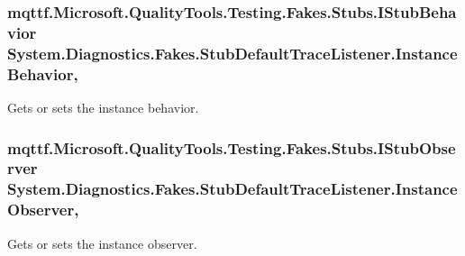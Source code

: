 \hypertarget{class_system_1_1_diagnostics_1_1_fakes_1_1_stub_default_trace_listener_ae485fa4b34ce449699b4502839963977}{
\subsubsection[{Instance\-Behavior}]{\setlength{\rightskip}{0pt plus 5cm}mqttf.\-Microsoft.\-Quality\-Tools.\-Testing.\-Fakes.\-Stubs.\-I\-Stub\-Behavior System.\-Diagnostics.\-Fakes.\-Stub\-Default\-Trace\-Listener.\-Instance\-Behavior\hspace{0.3cm}{\ttfamily [get]}, {\ttfamily [set]}}}\label{class_system_1_1_diagnostics_1_1_fakes_1_1_stub_default_trace_listener_ae485fa4b34ce449699b4502839963977}


Gets or sets the instance behavior.

\hypertarget{class_system_1_1_diagnostics_1_1_fakes_1_1_stub_default_trace_listener_a4d3e809aed363f2afbf062638d3773e4}{
\subsubsection[{Instance\-Observer}]{\setlength{\rightskip}{0pt plus 5cm}mqttf.\-Microsoft.\-Quality\-Tools.\-Testing.\-Fakes.\-Stubs.\-I\-Stub\-Observer System.\-Diagnostics.\-Fakes.\-Stub\-Default\-Trace\-Listener.\-Instance\-Observer\hspace{0.3cm}{\ttfamily [get]}, {\ttfamily [set]}}}\label{class_system_1_1_diagnostics_1_1_fakes_1_1_stub_default_trace_listener_a4d3e809aed363f2afbf062638d3773e4}


Gets or sets the instance observer.

